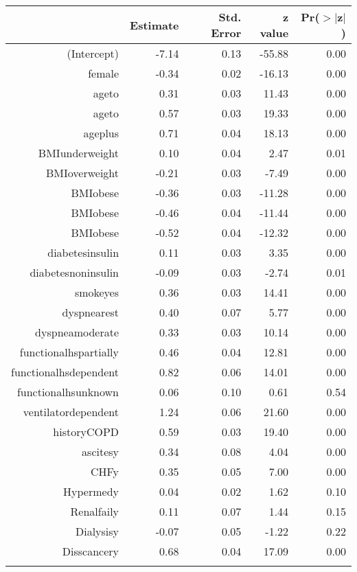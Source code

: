 \bigskip\bigskip
\centering
\begin{tabular}{rrrrr}
  \hline
 & Estimate & Std. Error & z value & Pr($>$$|$z$|$) \\ 
  \hline
(Intercept) & -7.14 & 0.13 & -55.88 & 0.00 \\ 
  female & -0.34 & 0.02 & -16.13 & 0.00 \\ 
  age\-65\-to\-74 & 0.31 & 0.03 & 11.43 & 0.00 \\ 
  age\-75\-to\-84 & 0.57 & 0.03 & 19.33 & 0.00 \\ 
  age\-85\-plus & 0.71 & 0.04 & 18.13 & 0.00 \\ 
  BMI\-underweight & 0.10 & 0.04 & 2.47 & 0.01 \\ 
  BMI\-overweight & -0.21 & 0.03 & -7.49 & 0.00 \\ 
  BMI\-obese\-1 & -0.36 & 0.03 & -11.28 & 0.00 \\ 
  BMI\-obese\-2 & -0.46 & 0.04 & -11.44 & 0.00 \\ 
  BMI\-obese\-3 & -0.52 & 0.04 & -12.32 & 0.00 \\ 
  diabetes\-insulin & 0.11 & 0.03 & 3.35 & 0.00 \\ 
  diabetes\-noninsulin & -0.09 & 0.03 & -2.74 & 0.01 \\ 
  smoke\-yes & 0.36 & 0.03 & 14.41 & 0.00 \\ 
  dyspnea\-rest & 0.40 & 0.07 & 5.77 & 0.00 \\ 
  dyspnea\-moderate & 0.33 & 0.03 & 10.14 & 0.00 \\ 
  functional\-hs\-partially & 0.46 & 0.04 & 12.81 & 0.00 \\ 
  functional\-hs\-dependent & 0.82 & 0.06 & 14.01 & 0.00 \\ 
  functional\-hs\-unknown & 0.06 & 0.10 & 0.61 & 0.54 \\ 
  ventilator\-dependent & 1.24 & 0.06 & 21.60 & 0.00 \\ 
  history\-COPD & 0.59 & 0.03 & 19.40 & 0.00 \\ 
  ascites\-y & 0.34 & 0.08 & 4.04 & 0.00 \\ 
  CHF\-y & 0.35 & 0.05 & 7.00 & 0.00 \\ 
  Hyper\-med\-y & 0.04 & 0.02 & 1.62 & 0.10 \\ 
  Renal\-fail\-y & 0.11 & 0.07 & 1.44 & 0.15 \\ 
  Dialysis\-y & -0.07 & 0.05 & -1.22 & 0.22 \\ 
  Diss\-cancer\-y & 0.68 & 0.04 & 17.09 & 0.00 \\ 
$$
\end{tabular}

